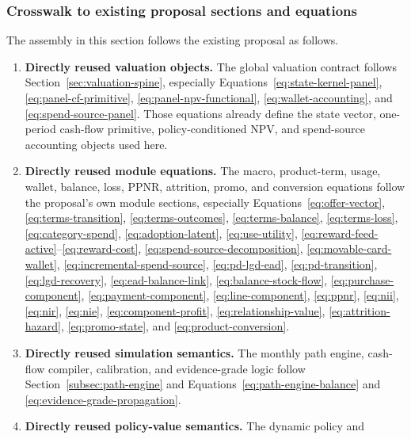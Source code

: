 \documentclass[11pt]{article}
\newcommand{\1}{\mathbf{1}}
\begin{document}
\subsubsection{Crosswalk to existing proposal sections and equations}
\label{subsec:state-space-crosswalk}

The assembly in this section follows the existing proposal as follows.
\begin{enumerate}[label=\arabic*.]
  \item \textbf{Directly reused valuation objects.} The global valuation contract
        follows Section~\ref{sec:valuation-spine}, especially
        Equations~\eqref{eq:state-kernel-panel},
        \eqref{eq:panel-cf-primitive},
        \eqref{eq:panel-npv-functional},
        \eqref{eq:wallet-accounting}, and
        \eqref{eq:spend-source-panel}. Those equations already define the state
        vector, one-period cash-flow primitive, policy-conditioned NPV, and
        spend-source accounting objects used here.
  \item \textbf{Directly reused module equations.} The macro, product-term,
        usage, wallet, balance, loss, PPNR, attrition, promo, and conversion
        equations follow the proposal's own module sections, especially
        Equations~\eqref{eq:offer-vector}, \eqref{eq:terms-transition},
        \eqref{eq:terms-outcomes}, \eqref{eq:terms-balance},
        \eqref{eq:terms-loss}, \eqref{eq:category-spend},
        \eqref{eq:adoption-latent}, \eqref{eq:use-utility},
        \eqref{eq:reward-feed-active}--\eqref{eq:reward-cost},
        \eqref{eq:spend-source-decomposition},
        \eqref{eq:movable-card-wallet},
        \eqref{eq:incremental-spend-source}, \eqref{eq:pd-lgd-ead},
        \eqref{eq:pd-transition}, \eqref{eq:lgd-recovery},
        \eqref{eq:ead-balance-link}, \eqref{eq:balance-stock-flow},
        \eqref{eq:purchase-component}, \eqref{eq:payment-component},
        \eqref{eq:line-component}, \eqref{eq:ppnr}, \eqref{eq:nii},
        \eqref{eq:nir}, \eqref{eq:nie}, \eqref{eq:component-profit},
        \eqref{eq:relationship-value}, \eqref{eq:attrition-hazard},
        \eqref{eq:promo-state}, and \eqref{eq:product-conversion}.
  \item \textbf{Directly reused simulation semantics.} The monthly path engine,
        cash-flow compiler, calibration, and evidence-grade logic follow
        Section~\ref{subsec:path-engine} and
        Equations~\eqref{eq:path-engine-balance} and
        \eqref{eq:evidence-grade-propagation}.
  \item \textbf{Directly reused policy-value semantics.} The dynamic policy and

\end{enumerate}
\end{document}
